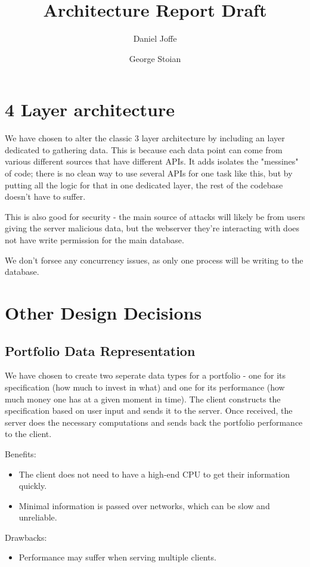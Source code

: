 \documentclass[a4paper,11pt]{article}
\title{Architecture Report Draft}
\date{}
\author{Daniel Joffe\\
  \and George Stoian\\
}
\begin{document}
\maketitle

\section{4 Layer architecture}
We have chosen to alter the classic 3 layer architecture by including an layer dedicated to gathering data. This is because each data point can come from various different sources that have different APIs. It adds isolates the "messines" of code; there is no clean way to use several APIs for one task like this, but by putting all the logic for that in one dedicated layer, the rest of the codebase doesn't have to suffer.

This is also good for security - the main source of attacks will likely be from users giving the server malicious data, but the webserver they're interacting with does not have write permission for the main database.

We don't forsee any concurrency issues, as only one process will be writing to the database.

\section{Other Design Decisions}
\subsection{Portfolio Data Representation}
We have chosen to create two seperate data types for a portfolio - one for its specification (how much to invest in what) and one for its performance (how much money one has at a given moment in time). The client constructs the specification based on user input and sends it to the server. Once received, the server does the necessary computations and sends back the portfolio performance to the client. \break

Benefits:
\begin{itemize}
  \item The client does not need to have a high-end CPU to get their information quickly.
  \item Minimal information is passed over networks, which can be slow and unreliable.
\end{itemize}

Drawbacks:
\begin{itemize}
  \item Performance may suffer when serving multiple clients.
\end{itemize}
\end{document}
